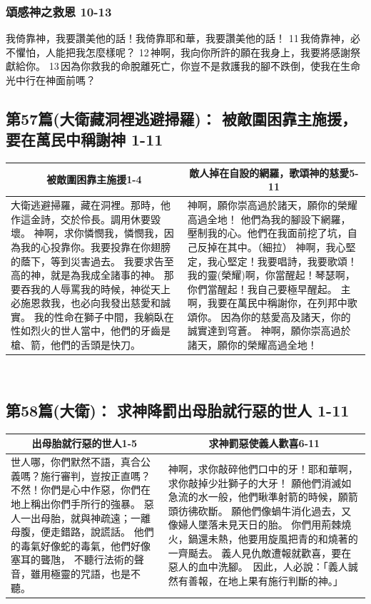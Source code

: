 \subsubsection{頌感神之救恩 10-13}
我倚靠神，我要讚美他的話！我倚靠耶和華，我要讚美他的話！
11 我倚靠神，必不懼怕，人能把我怎麼樣呢？
12 神啊，我向你所許的願在我身上，我要將感謝祭獻給你。
13 因為你救我的命脫離死亡，你豈不是救護我的腳不跌倒，使我在生命光中行在神面前嗎？

\subsection{第57篇(大衛藏洞裡逃避掃羅)： 被敵圍困靠主施援，要在萬民中稱謝神 1-11}
\begin{table}[H]
\centering
\begin{tabular}{p{8.7cm}|p{9cm}}\hline\hline
\multicolumn{1}{c|}{被敵圍困靠主施援1-4}&\multicolumn{1}{c}{敵人掉在自設的網羅，歌頌神的慈愛5-11}\\\hline
大衛逃避掃羅，藏在洞裡。那時，他作這金詩，交於伶長。調用休要毀壞。
神啊，求你憐憫我，憐憫我，因為我的心投靠你。我要投靠在你翅膀的蔭下，等到災害過去。
我要求告至高的神，就是為我成全諸事的神。
那要吞我的人辱罵我的時候，神從天上必施恩救我，也必向我發出慈愛和誠實。
我的性命在獅子中間，我躺臥在性如烈火的世人當中，他們的牙齒是槍、箭，他們的舌頭是快刀。
&神啊，願你崇高過於諸天，願你的榮耀高過全地！
他們為我的腳設下網羅，壓制我的心。他們在我面前挖了坑，自己反掉在其中。（細拉）
神啊，我心堅定，我心堅定！我要唱詩，我要歌頌！
我的靈(榮耀)啊，你當醒起！琴瑟啊，你們當醒起！我自己要極早醒起。
主啊，我要在萬民中稱謝你，在列邦中歌頌你。
因為你的慈愛高及諸天，你的誠實達到穹蒼。
神啊，願你崇高過於諸天，願你的榮耀高過全地！\\\hline
\end{tabular}
\end{table} 

\subsection{第58篇(大衛)： 求神降罰出母胎就行惡的世人 1-11}
\begin{table}[H]
\centering
\begin{tabular}{p{7.5cm}|p{9.8cm}}\hline\hline
\multicolumn{1}{c|}{出母胎就行惡的世人1-5}&\multicolumn{1}{c}{求神罰惡使義人歡喜6-11}\\\hline
世人哪，你們默然不語，真合公義嗎？施行審判，豈按正直嗎？
不然！你們是心中作惡，你們在地上稱出你們手所行的強暴。
惡人一出母胎，就與神疏遠；一離母腹，便走錯路，說謊話。
他們的毒氣好像蛇的毒氣，他們好像塞耳的聾虺，
不聽行法術的聲音，雖用極靈的咒語，也是不聽。
&神啊，求你敲碎他們口中的牙！耶和華啊，求你敲掉少壯獅子的大牙！
願他們消滅如急流的水一般，他們瞅準射箭的時候，願箭頭彷彿砍斷。
願他們像蝸牛消化過去，又像婦人墜落未見天日的胎。
你們用荊棘燒火，鍋還未熱，他要用旋風把青的和燒著的一齊颳去。
義人見仇敵遭報就歡喜，要在惡人的血中洗腳。
 因此，人必說：「義人誠然有善報，在地上果有施行判斷的神。」\\\hline
\end{tabular}
\end{table} 


